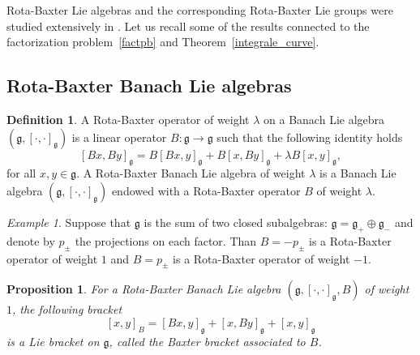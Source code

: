 \documentclass[a4paper,12pt,reqno]{amsart}%
\newtheorem{proposition}[theorem]{Proposition}
\theoremstyle{definition}
\newtheorem{definition}[theorem]{Definition}
\theoremstyle{remark}
\newtheorem{example}[theorem]{Example}
\numberwithin{theorem}{section}
\numberwithin{equation}{section}
\newcommand{\1}{{\bf 1}}
\newcommand{\g}{{\mathfrak g}}
\begin{document}
Rota-Baxter Lie algebras and the corresponding Rota-Baxter Lie groups were studied extensively in 
\cite{guo2021}. Let us recall some of the results connected to the factorization problem~\ref{factpb} and Theorem~\ref{integrale_curve}.


\subsection{Rota-Baxter Banach Lie algebras}

\begin{definition}
A Rota-Baxter operator of weight $\lambda$ on a Banach Lie algebra $(\g, [\cdot, \cdot]_\g)$ is a linear operator $B:\g\rightarrow \g$ such that the following identity holds
 \begin{equation}\label{baxter}
    [Bx, By]_\g = B[Bx, y]_\g + B[x, By]_\g + \lambda B[x, y]_\g,
\end{equation}
    for all $x, y \in \g$. 
 A Rota-Baxter Banach Lie algebra of weight $\lambda$ is a Banach Lie algebra $(\g, [\cdot, \cdot]_\g)$ endowed with a 
 Rota-Baxter operator $B$ of weight $\lambda$.
\end{definition}


\begin{example}
    Suppose that $\g$ is the sum of two closed subalgebras: $\g = \g_+\oplus \g_-$ and denote by $p_\pm$ the projections on each factor. Than $B = -p_\pm$ is a Rota-Baxter operator of weight $1$ and $B = p_\pm$ is a Rota-Baxter operator of weight $-1$. 
\end{example}


\begin{proposition}
For a Rota-Baxter Banach Lie algebra $(\g, [\cdot, \cdot]_\g, B)$ of weight $1$, the following bracket
\begin{equation}\label{bracketB}
    [x, y]_B = [Bx, y]_\g + [x, By]_\g + [x,y]_\g
\end{equation}
    is a Lie bracket on $\g$, called the Baxter bracket associated to $B$.
\end{proposition}
\end{document}
